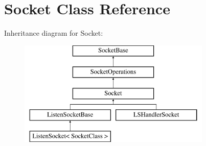 \hypertarget{classSocket}{
\section{Socket Class Reference}
\label{classSocket}
}
Inheritance diagram for Socket:\begin{figure}[H]
\begin{center}
\leavevmode
\includegraphics[height=5.000000cm]{classSocket}
\end{center}
\end{figure}

